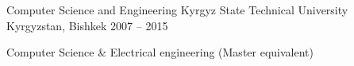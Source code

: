 \begin{cventries}
  \cventry
    {Computer Science and Engineering}
    {Kyrgyz State Technical University}
    {Kyrgyzstan, Bishkek}
    {2007 – 2015}
    {
      \begin{cvitems}
        \item {Computer Science \& Electrical engineering (Master equivalent)}
      \end{cvitems}
    }
\end{cventries}

